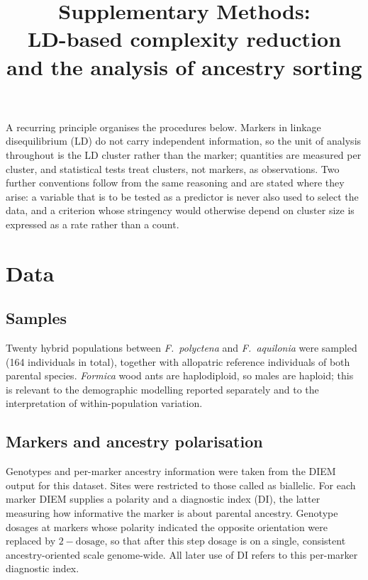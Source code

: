 \documentclass[11pt]{article}
\title{\vspace{-3em}Supplementary Methods:\\
LD-based complexity reduction and the analysis of ancestry sorting}
\author{}
\date{}
\newcommand{\Faq}{\textit{F.~aquilonia}}
\newcommand{\Fpo}{\textit{F.~polyctena}}
\begin{document}
\maketitle
\vspace{-4em}

\noindent A recurring principle organises the procedures below. Markers in
linkage disequilibrium (LD) do not carry independent information, so the unit of
analysis throughout is the LD cluster rather than the marker; quantities are
measured per cluster, and statistical tests treat clusters, not markers, as
observations. Two further conventions follow from the same reasoning and are
stated where they arise: a variable that is to be tested as a predictor is never
also used to select the data, and a criterion whose stringency would otherwise
depend on cluster size is expressed as a rate rather than a count.

\section{Data}

\subsection{Samples}
Twenty hybrid populations between \Fpo{} and \Faq{} were sampled (164
individuals in total), together with allopatric reference individuals of both
parental species. \textit{Formica} wood ants are haplodiploid, so males are
haploid; this is relevant to the demographic modelling reported separately and
to the interpretation of within-population variation.

\subsection{Markers and ancestry polarisation}
Genotypes and per-marker ancestry information were taken from the DIEM output
for this dataset. Sites were restricted to those called as biallelic. For each
marker DIEM supplies a polarity and a diagnostic index (DI), the latter
measuring how informative the marker is about parental ancestry. Genotype
dosages at markers whose polarity indicated the opposite orientation were
replaced by $2-\text{dosage}$, so that after this step dosage is on a single,
consistent ancestry-oriented scale genome-wide. All later use of DI refers to
this per-marker diagnostic index.
\end{document}
